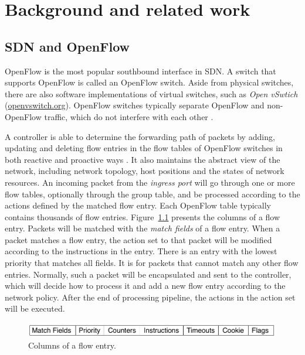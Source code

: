 \chapter{Background and related work}
\section{SDN and OpenFlow}
OpenFlow is the most popular southbound interface in SDN. A switch that supports OpenFlow is called an OpenFlow switch. Aside from physical switches, there are also software implementations of virtual switches, such as \textit{Open vSwtich} (\url{openvswitch.org}). OpenFlow switches typically separate OpenFlow and non-OpenFlow traffic, which do not interfere with each other \cite{HP_SPEC}.

A controller is able to determine the forwarding path of packets by adding, updating and deleting flow entries in the flow tables of OpenFlow switches in both reactive and proactive ways \cite{OF_SPEC}. It also maintains the abstract view of the network, including network topology, host positions and the states of network resources. An incoming packet from the \textit{ingress port} will go through one or more flow tables, optionally through the group table, and be processed according to the actions defined by the matched flow entry. Each OpenFlow table typically contains thousands of flow entries. Figure~\ref{FE_Col} presents the columns of a flow entry. Packets will be matched with the \textit{match fields} of a flow entry. When a packet matches a flow entry, the action set to that packet will be modified according to the instructions in the entry. There is an entry with the lowest priority that matches all fields. It is for packets that cannot match any other flow entries. Normally, such a packet will be encapsulated and sent to the controller, which will decide how to process it and add a new flow entry according to the network policy. After the end of processing pipeline, the actions in the action set will be executed.%

\begin{figure}[H]
\begin{center} 
\includegraphics[width=1\textwidth]{figures/columns_of_flow_entry.png}
\end{center}
\caption{Columns of a flow entry.}
\label{FE_Col}
\end{figure}


